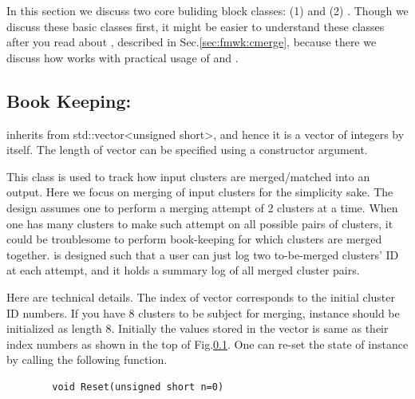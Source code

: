 In this section we discuss two core buliding block classes: (1) {\cbalgo} and (2) {\cbkeeper}. Though we discuss these basic {\CPP} classes first, it might be easier to understand these classes after you read about {\cmerge}, described in Sec.{\ref{sec:fmwk:cmerge}}, because there we discuss how {\cmerge} works with practical usage of {\cbalgo} and {\cbkeeper}.

\subsection{Book Keeping: {\cbkeeper}}
\label{sec:fmwk:base:cbk}
{\cbkeeper} inherits from {\ttfamily std::vector<unsigned short>}, and hence it is a vector of integers by itself.
The length of vector can be specified using a constructor argument.

This class is used to track how input clusters are merged/matched into an output. 
Here we focus on merging of input clusters for the simplicity sake.
The design assumes one to perform a merging attempt of 2 clusters at a time.
When one has many clusters to make such attempt on all possible pairs of clusters, it could be troublesome to perform book-keeping for which clusters are merged together.
{\cbkeeper} is designed such that a user can just log two to-be-merged clusters' ID at each attempt, and it holds a summary log of all merged cluster pairs.


Here are technical details.
The index of vector corresponds to the initial cluster ID numbers.
If you have 8 clusters to be subject for merging, {\cbkeeper} instance should be initialized as length 8.
Initially the values stored in the vector is same as their index numbers as shown in the top of Fig.\ref{sec:fmwk:base:cbk}.
One can re-set the state of {\cbkeeper} instance by calling the following function.
\begin{lstlisting}
        void Reset(unsigned short n=0)
\end{lstlisting}

